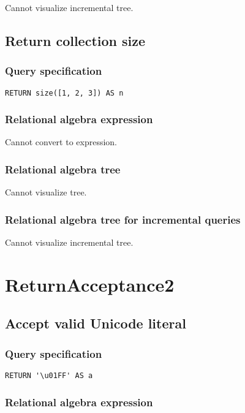 Cannot visualize incremental tree.

\subsection{Return collection size}

\subsubsection*{Query specification}

\begin{lstlisting}
RETURN size([1, 2, 3]) AS n
\end{lstlisting}

\subsubsection*{Relational algebra expression}

Cannot convert to expression.

\subsubsection*{Relational algebra tree}

Cannot visualize tree.

\subsubsection*{Relational algebra tree for incremental queries}

Cannot visualize incremental tree.

\section{ReturnAcceptance2}

\subsection{Accept valid Unicode literal}

\subsubsection*{Query specification}

\begin{lstlisting}
RETURN '\u01FF' AS a
\end{lstlisting}

\subsubsection*{Relational algebra expression}

